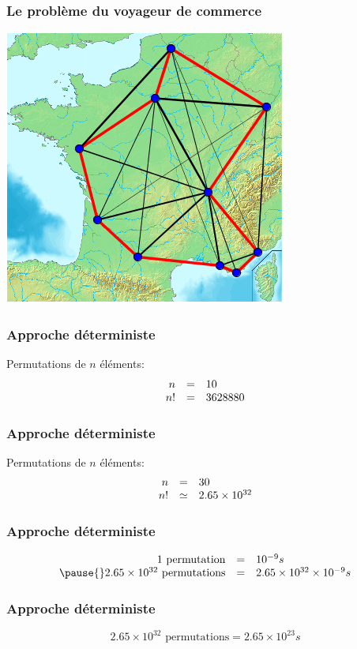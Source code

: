 \documentclass[16pt]{beamer}
\begin{document}
\begin{frame}
  \frametitle{Le problème du voyageur de commerce}
  \begin{center}
    \includegraphics[scale=0.7]{Carte_france_10_villes.png}
  \end{center}
\end{frame}

\begin{frame}
  \frametitle{Approche déterministe}
  Permutations de $n$ éléments:
  \[
  \begin{array}{r c l}
  n &=& 10 \\
  n! &=& 3 628 880
  \end{array}
  \]
\end{frame}

\begin{frame}
  \frametitle{Approche déterministe}
  Permutations de $n$ éléments:
  \[
  \begin{array}{r c l}
  n &=& 30 \\
  n! &\simeq& 2.65 \times 10^{32}
  \end{array}
  \]
\end{frame}

\begin{frame}
  \frametitle{Approche déterministe}
  \[
  \begin{array}{r c l}
  1 \text{ permutation} &=& 10^{-9}s \\ \pause{}
  2.65 \times 10^{32} \text{ permutations} &=& 2.65 \times 10^{32} \times 10^{-9}s
  \end{array}
  \]
\end{frame}

\begin{frame}
  \frametitle{Approche déterministe}
  \[
  2.65 \times 10^{32} \text{ permutations} = 2.65 \times 10^{23}s
  \]
\end{frame}
\end{document}

